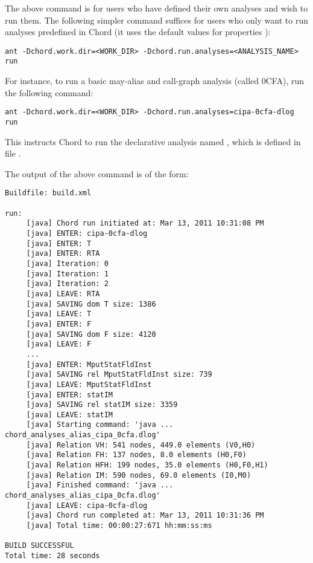 The above command is for users who have defined their own analyses and wish
to run them.  The following simpler command suffices for users who only want
to run analyses predefined in Chord (it uses the default values for
properties ):

\begin{framed}
\begin{verbatim}
ant -Dchord.work.dir=<WORK_DIR> -Dchord.run.analyses=<ANALYSIS_NAME> run
\end{verbatim}
\end{framed}

For instance, to run a basic may-alias and call-graph analysis (called 0CFA),
run the following command:

\begin{framed}
\begin{verbatim}
ant -Dchord.work.dir=<WORK_DIR> -Dchord.run.analyses=cipa-0cfa-dlog run
\end{verbatim}
\end{framed}

This instructs Chord to run the declarative analysis named ,
which is defined in file .

The output of the above command is of the form:

\begin{framed}
{\small
\begin{verbatim}
Buildfile: build.xml

run:
     [java] Chord run initiated at: Mar 13, 2011 10:31:08 PM
     [java] ENTER: cipa-0cfa-dlog
     [java] ENTER: T
     [java] ENTER: RTA
     [java] Iteration: 0
     [java] Iteration: 1
     [java] Iteration: 2
     [java] LEAVE: RTA
     [java] SAVING dom T size: 1386
     [java] LEAVE: T
     [java] ENTER: F
     [java] SAVING dom F size: 4120
     [java] LEAVE: F
     ...
     [java] ENTER: MputStatFldInst
     [java] SAVING rel MputStatFldInst size: 739
     [java] LEAVE: MputStatFldInst
     [java] ENTER: statIM
     [java] SAVING rel statIM size: 3359
     [java] LEAVE: statIM
     [java] Starting command: 'java ... chord_analyses_alias_cipa_0cfa.dlog'
     [java] Relation VH: 541 nodes, 449.0 elements (V0,H0)
     [java] Relation FH: 137 nodes, 8.0 elements (H0,F0)
     [java] Relation HFH: 199 nodes, 35.0 elements (H0,F0,H1)
     [java] Relation IM: 590 nodes, 69.0 elements (I0,M0)
     [java] Finished command: 'java ... chord_analyses_alias_cipa_0cfa.dlog'
     [java] LEAVE: cipa-0cfa-dlog
     [java] Chord run completed at: Mar 13, 2011 10:31:36 PM
     [java] Total time: 00:00:27:671 hh:mm:ss:ms

BUILD SUCCESSFUL
Total time: 28 seconds
\end{verbatim}
}
\end{framed}


